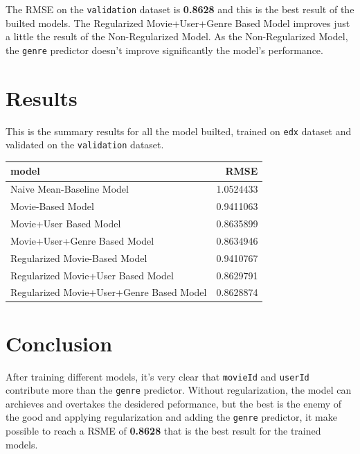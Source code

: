 \documentclass[
]{article}
\begin{document}
The RMSE on the \texttt{validation} dataset is \textbf{0.8628} and this
is the best result of the builted models. The Regularized
Movie+User+Genre Based Model improves just a little the result of the
Non-Regularized Model. As the Non-Regularized Model, the \texttt{genre}
predictor doesn't improve significantly the model's performance.

\hypertarget{results}{%
\section{Results}\label{results}}

This is the summary results for all the model builted, trained on
\texttt{edx} dataset and validated on the \texttt{validation} dataset.

\begin{table}
\centering\begingroup\fontsize{10}{12}\selectfont

\begin{tabular}{l|r}
\hline
model & RMSE\\
\hline
Naive Mean-Baseline Model & 1.0524433\\
\hline
Movie-Based Model & 0.9411063\\
\hline
Movie+User Based Model & 0.8635899\\
\hline
Movie+User+Genre Based Model & 0.8634946\\
\hline
Regularized Movie-Based Model & 0.9410767\\
\hline
Regularized Movie+User Based Model & 0.8629791\\
\hline
Regularized Movie+User+Genre Based Model & 0.8628874\\
\hline
\end{tabular}
\endgroup{}
\end{table}

\hypertarget{conclusion}{%
\section{Conclusion}\label{conclusion}}

After training different models, it's very clear that \texttt{movieId}
and \texttt{userId} contribute more than the \texttt{genre} predictor.
Without regularization, the model can archieves and overtakes the
desidered peformance, but the best is the enemy of the good and applying
regularization and adding the \texttt{genre} predictor, it make possible
to reach a RSME of \textbf{0.8628} that is the best result for the
trained models.
\end{document}

